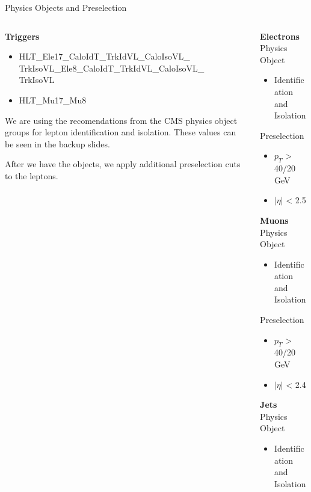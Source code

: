 \begin{frame}{Physics Objects and Preselection}
\begin{columns}
\begin{column}{0.6\textwidth}
   \footnotesize

 {\bf Triggers}\\
  \begin{itemize}
        \item
          HLT\_Ele17\_CaloIdT\_TrkIdVL\_CaloIsoVL\_\\
          TrkIsoVL\_Ele8\_CaloIdT\_TrkIdVL\_CaloIsoVL\_\\
          TrkIsoVL
        \item
          HLT\_Mu17\_Mu8
\end{itemize}

\vspace{2em}
We are using the recomendations from the CMS physics object groups for lepton identification and isolation.  These values can be seen in the backup slides.

\vspace{1em}

After we have the objects, we apply additional preselection cuts to the leptons.

\end{column}


      \begin{column}{0.4\textwidth}
        \footnotesize
        \scriptsize
  {\bf Electrons}\\
  Physics Object
  \begin{itemize}
    \footnotesize
  \item
    Identification and Isolation
    \end{itemize}
  Preselection
  \begin{itemize}
  \item
    $p_{T}$ > 40/20 GeV
  \item
    $|\eta|$ < 2.5
  \end{itemize}

  {\bf Muons}\\
  Physics Object
  \begin{itemize}
    \footnotesize
  \item
    Identification and Isolation
    \end{itemize}
  Preselection
  \begin{itemize}
  \item
    $p_{T}$ > 40/20 GeV
  \item
    $|\eta|$ < 2.4
  \end{itemize}
 {\bf Jets}\\
        Physics Object
        \begin{itemize}
        \item
          Identification and Isolation
        \end{itemize}
        

\end{column}
\end{columns}
\end{frame}
